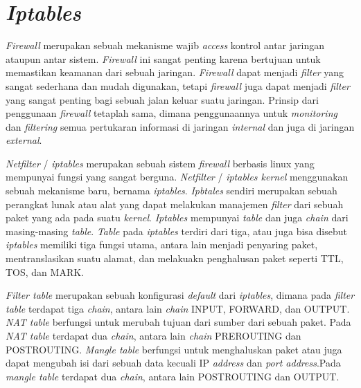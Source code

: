  \section{\textit{Iptables}} 
 \textit{Firewall} merupakan sebuah mekanisme wajib \textit{access} kontrol antar jaringan ataupun antar sistem. \textit{Firewall} ini sangat penting karena bertujuan untuk memastikan keamanan dari sebuah jaringan. \textit{Firewall} dapat menjadi \textit{filter} yang sangat sederhana dan mudah digunakan, tetapi \textit{firewall} juga dapat menjadi \textit{filter} yang sangat penting bagi sebuah jalan keluar suatu jaringan. Prinsip dari penggunaan \textit{firewall} tetaplah sama, dimana penggunaannya untuk \textit{monitoring} dan \textit{filtering} semua pertukaran informasi di jaringan \textit{internal} dan juga di jaringan \textit{external}.
 
 \textit{Netfilter} / \textit{iptables} merupakan sebuah sistem \textit{firewall} berbasis linux yang mempunyai fungsi yang sangat berguna. \textit{Netfilter} / \textit{iptables kernel} menggunakan sebuah mekanisme baru, bernama \textit{iptables}. \textit{Ipbtales} sendiri merupakan sebuah perangkat lunak atau alat yang dapat melakukan manajemen \textit{filter} dari sebuah paket yang ada pada suatu \textit{kernel}. \textit{Iptables} mempunyai \textit{table} dan juga \textit{chain} dari masing-masing \textit{table}. \textit{Table} pada \textit{iptables} terdiri dari tiga, atau juga bisa disebut \textit{iptables} memiliki tiga fungsi utama, antara lain menjadi penyaring paket, mentranslasikan suatu alamat, dan melakuakn penghalusan paket seperti TTL, TOS, dan MARK.
 
 \textit{Filter table} merupakan sebuah konfigurasi \textit{default} dari \textit{iptables}, dimana pada \textit{filter table} terdapat tiga \textit{chain}, antara lain \textit{chain} INPUT, FORWARD, dan OUTPUT. \textit{NAT table} berfungsi untuk merubah tujuan dari sumber dari sebuah paket. Pada \textit{NAT table} terdapat dua \textit{chain}, antara lain \textit{chain} PREROUTING dan POSTROUTING. \textit{Mangle table} berfungsi untuk menghaluskan paket atau juga dapat mengubah isi dari sebuah data kecuali IP \textit{address} dan \textit{port address}.Pada \textit{mangle table} terdapat dua \textit{chain}, antara lain POSTROUTING dan OUTPUT.
	 

